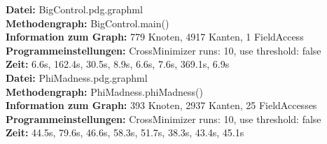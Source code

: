 \textbf{Datei: }BigControl.pdg.graphml\\
\textbf{Methodengraph: }BigControl.main()\\
\textbf{Information zum Graph: }779 Knoten, 4917 Kanten, 1 FieldAccess\\
\textbf{Programmeinstellungen: }CrossMinimizer runs: 10, use threshold: false\\
\textbf{Zeit: }6.6s, 162.4s, 30.5s, 8.9s, 6.6s, 7.6s, 369.1s, 6.9s \\

\textbf{Datei: }PhiMadness.pdg.graphml\\
\textbf{Methodengraph: }PhiMadness.phiMadness()\\
\textbf{Information zum Graph: }393 Knoten, 2937 Kanten, 25 FieldAccesses\\
\textbf{Programmeinstellungen: }CrossMinimizer runs: 10, use threshold: false\\
\textbf{Zeit: }44.5s, 79.6s, 46.6s, 58.3s, 51.7s, 38.3s, 43.4s, 45.1s\\




